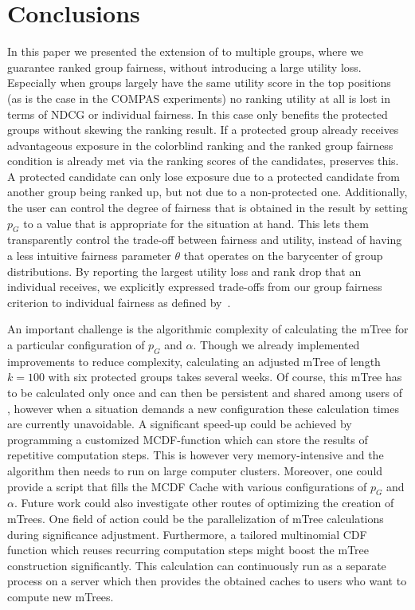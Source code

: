 \section{Conclusions}\label{sec:conclusions}

In this paper we presented the extension of \algoFAIR to multiple groups, where we guarantee ranked group fairness, without introducing a large utility loss.
%
Especially when groups largely have the same utility score in the top positions (as is the case in the COMPAS experiments) no ranking utility at all is lost in terms of NDCG or individual fairness.
%
In this case \algoFAIR only benefits the protected groups without skewing the ranking result.
%
If a protected group already receives advantageous exposure in the colorblind ranking and the ranked group fairness condition is already met via the ranking scores of the candidates, \algoFAIR preserves this.
%
A protected candidate can only lose exposure due to a protected candidate from another group being ranked up, but not due to a non-protected one.
%
Additionally, the user can control the degree of fairness that is obtained in the result by setting $p_G$ to a value that is appropriate for the situation at hand.
%
This lets them transparently control the trade-off between fairness and utility, instead of having a less intuitive fairness parameter $\theta$ that operates on the barycenter of group distributions.
%
By reporting the largest utility loss and rank drop that an individual receives, we explicitly expressed trade-offs from our group fairness criterion to individual fairness as defined by~\citet{Dwork2012}.

%
An important challenge is the algorithmic complexity of calculating the mTree for a particular configuration of $p_G$ and $\alpha$.
%
Though we already implemented improvements to reduce complexity, calculating an adjusted mTree of length $k=100$ with six protected groups takes several weeks.
%
Of course, this mTree has to be calculated only once and can then be persistent and shared among users of \algoFAIR, however when a situation demands a new configuration these calculation times are currently unavoidable.
%
A significant speed-up could be achieved by programming a customized MCDF-function which can store the results of repetitive computation steps.
%
This is however very memory-intensive and the algorithm then needs to run on large computer clusters.
%
Moreover, one could provide a script that fills the MCDF Cache with various configurations of $p_G$ and $\alpha$.
%
Future work could also investigate other routes of optimizing the creation of mTrees. One field of action could be the parallelization of mTree calculations during significance adjustment. Furthermore, a tailored multinomial CDF function which reuses recurring computation steps might boost the mTree construction significantly.
%
This calculation can continuously run as a separate process on a server which then provides the obtained caches to users who want to compute new mTrees.

